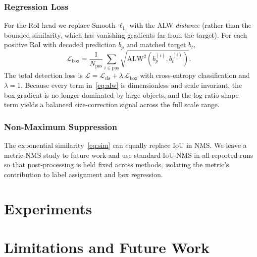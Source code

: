 \documentclass[journal]{IEEEtran}
\newcommand{\alwsq}{\text{ALW}^2}
\begin{document}
\subsubsection{Regression Loss}

For the RoI head we replace Smooth-$\ell_1$ with the ALW \emph{distance}
(rather than the bounded similarity, which has vanishing gradients far from
the target). For each positive RoI with decoded prediction $b_p$ and matched
target $b_t$,
\begin{equation}
\mathcal{L}_{\text{box}} = \frac{1}{N_{\text{pos}}}\sum_{i\in\text{pos}}
       \sqrt{\alwsq(b_p^{(i)}, b_t^{(i)})}.
\label{eq:loss}
\end{equation}
The total detection loss is
$\mathcal{L}=\mathcal{L}_{\text{cls}}+\lambda\,\mathcal{L}_{\text{box}}$ with
cross-entropy classification and $\lambda=1$. Because every term
in~\eqref{eq:alw} is dimensionless and scale invariant, the box gradient is no
longer dominated by large objects, and the log-ratio shape term yields a
balanced size-correction signal across the full scale range.

\subsubsection{Non-Maximum Suppression}

The exponential similarity~\eqref{eq:sim} can equally replace IoU in NMS. We
leave a metric-NMS study to future work and use standard IoU-NMS in all
reported runs so that post-processing is held fixed across methods, isolating
the metric's contribution to label assignment and box regression.

\section{Experiments}
\label{sec:exp}


\section{Limitations and Future Work}
\label{sec:limitations}
\end{document}
